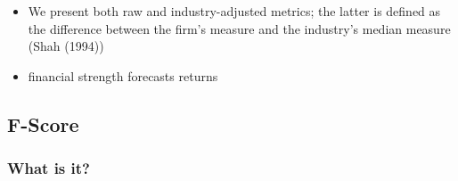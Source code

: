 \documentclass[12pt]{article}
\begin{document}
\begin{itemize}
            \item We present both raw and industry-adjusted metrics; the latter is defined as the difference between the firm’s measure and the industry’s median measure (Shah (1994)) \citep{Klein2009}

            \item financial strength forecasts returns \citep{Choi2012}
        \end{itemize}

\subsection{F-Score}

    \subsubsection{What is it?}
\end{document}
